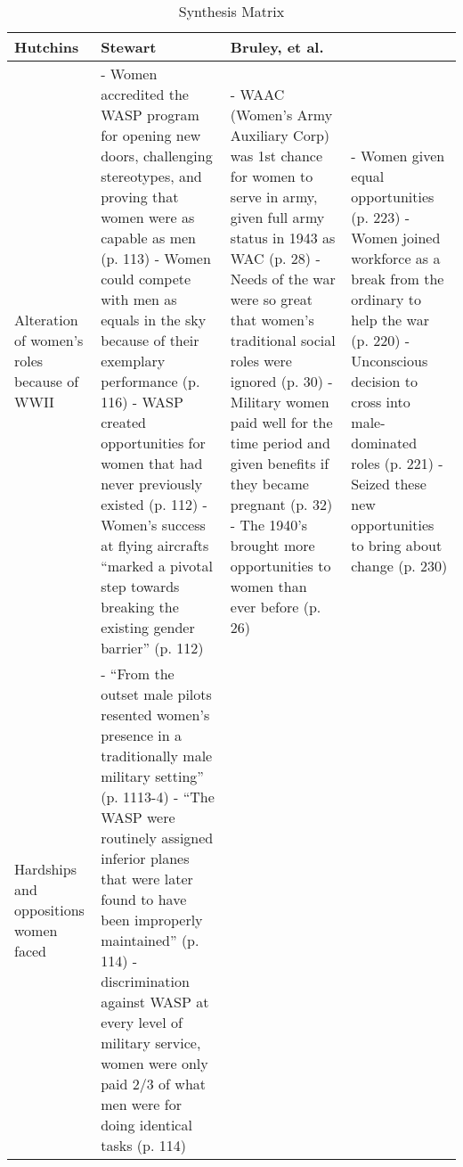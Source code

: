 \begin{table}%
\caption{Synthesis Matrix}
\label{tab:synthesis-matrix}
\begin{minipage}{\columnwidth}
\begin{center}
\begin{tabular}{|p{0.75in}|p{1.75in}|p{1.75in}|p{1.75in}|}
\hline
Hutchins\cite{cornelsen} & Stewart\cite{stewart} & Bruley, et al.\cite{bruley} \\
\hline
Alteration of women's roles because of WWII &
- Women accredited the WASP program for opening new doors, challenging stereotypes, and proving that women were as capable as men (p. 113)\newline
- Women could compete with men as equals in the sky because of their exemplary
performance (p. 116)\newline
- WASP created opportunities for women that had never previously existed (p. 112)\newline
- Women's success at flying aircrafts ``marked a pivotal step towards breaking the
existing gender barrier'' (p. 112) &
- WAAC (Women's Army Auxiliary Corp) was 1st chance for women to serve in army, given full army status in 1943 as WAC (p. 28)\newline
- Needs of the war were so great that women's traditional social roles were ignored (p. 30)\newline
- Military women paid well for the time period and given benefits if they became pregnant (p. 32)\newline
- The 1940's brought more opportunities to women than ever before (p. 26) &
- Women given equal opportunities (p. 223)\newline
- Women joined workforce as a break from the ordinary to help the war (p. 220)\newline
- Unconscious decision to cross into male-dominated roles (p. 221)\newline
- Seized these new opportunities to bring about change (p. 230) \\
\hline
Hardships and oppositions women faced &
- ``From the outset male pilots resented women's presence in a traditionally male military setting'' (p. 1113-4)\newline
- ``The WASP were routinely assigned inferior planes that were later found to have been improperly maintained'' (p. 114)\newline
- discrimination against WASP at every level of military service, women were only paid 2/3 of what men were for doing identical tasks (p. 114) &

\end{tabular}
\end{center}
\end{minipage}
\end{table}
